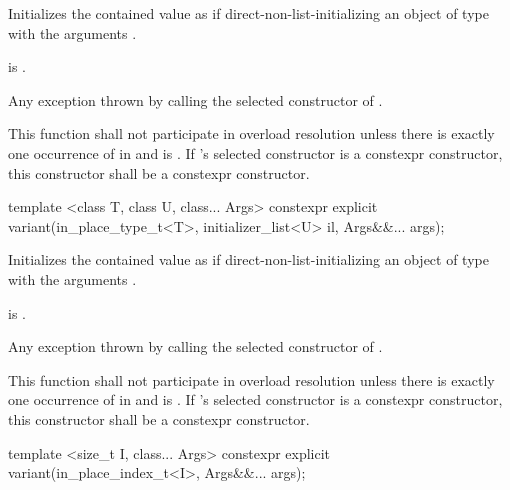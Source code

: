 \begin{itemdescr}
\pnum
\effects
Initializes the contained value as if direct-non-list-initializing
an object of type 
with the arguments .

\pnum
\postconditions
{} is .

\pnum
\throws
Any exception thrown by calling the selected constructor of .

\pnum
\remarks
This function shall not participate in overload resolution unless there is
exactly one occurrence of  in  and
 is .
If 's selected constructor is a constexpr constructor, this
constructor shall be a constexpr constructor.
\end{itemdescr}

%
\begin{itemdecl}
template <class T, class U, class... Args>
  constexpr explicit variant(in_place_type_t<T>, initializer_list<U> il, Args&&... args);
\end{itemdecl}

\begin{itemdescr}
\pnum
\effects
Initializes the contained value as if direct-non-list-initializing
an object of type 
with the arguments .

\pnum
\postconditions
{} is .

\pnum
\throws
Any exception thrown by calling the selected constructor of .

\pnum
\remarks
This function shall not participate in overload resolution unless there is
exactly one occurrence of  in  and
 is .
If 's selected constructor is a constexpr constructor, this
constructor shall be a constexpr constructor.
\end{itemdescr}

%
\begin{itemdecl}
template <size_t I, class... Args> constexpr explicit variant(in_place_index_t<I>, Args&&... args);
\end{itemdecl}

